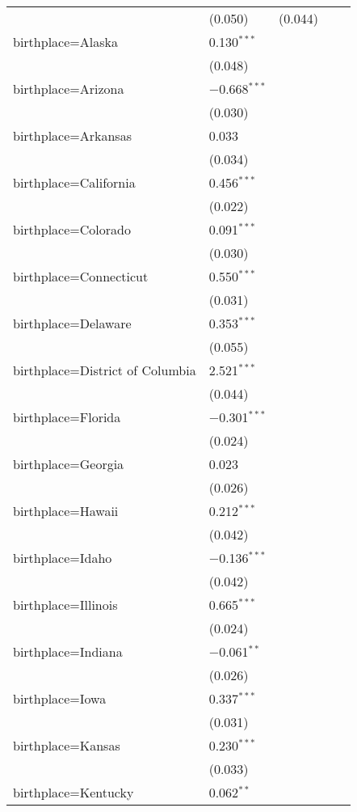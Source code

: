 \begin{longtable}{ll|rrr}
        & (0.050) & (0.044) \\ 
        birthplace=Alaska & 0.130$^{***}$ &  \\ 
        & (0.048) &  \\ 
        birthplace=Arizona & $-$0.668$^{***}$ &  \\ 
        & (0.030) &  \\ 
        birthplace=Arkansas & 0.033 &  \\ 
        & (0.034) &  \\ 
        birthplace=California & 0.456$^{***}$ &  \\ 
        & (0.022) &  \\ 
        birthplace=Colorado & 0.091$^{***}$ &  \\ 
        & (0.030) &  \\ 
        birthplace=Connecticut & 0.550$^{***}$ &  \\ 
        & (0.031) &  \\ 
        birthplace=Delaware & 0.353$^{***}$ &  \\ 
        & (0.055) &  \\ 
        birthplace=District of Columbia & 2.521$^{***}$ &  \\ 
        & (0.044) &  \\ 
        birthplace=Florida & $-$0.301$^{***}$ &  \\ 
        & (0.024) &  \\ 
        birthplace=Georgia & 0.023 &  \\ 
        & (0.026) &  \\ 
        birthplace=Hawaii & 0.212$^{***}$ &  \\ 
        & (0.042) &  \\ 
        birthplace=Idaho & $-$0.136$^{***}$ &  \\ 
        & (0.042) &  \\ 
        birthplace=Illinois & 0.665$^{***}$ &  \\ 
        & (0.024) &  \\ 
        birthplace=Indiana & $-$0.061$^{**}$ &  \\ 
        & (0.026) &  \\ 
        birthplace=Iowa & 0.337$^{***}$ &  \\ 
        & (0.031) &  \\ 
        birthplace=Kansas & 0.230$^{***}$ &  \\ 
        & (0.033) &  \\ 
        birthplace=Kentucky & 0.062$^{**}$ &  \\ 

\end{longtable}
